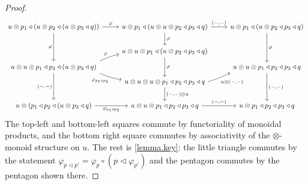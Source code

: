 \documentclass[11pt, one side, article]{memoir}
\theoremstyle{definition}
\theoremstyle{plain}
\newcommand{\0}{\textsf{0}}
\newcommand{\1}{\tn{\textsf{1}}}
\newcommand{\tri}{\mathbin{\triangleleft}}
\begin{document}
\begin{proof}
\[\fontsize{9.6pt}{9.6pt}\selectfont
\begin{tikzcd}
	u\otimes p_1\tri(u\otimes p_2\tri(u\otimes p_3\tri q))\ar[r, "\varphi"]\ar[dd, "\varphi"']&
	u\otimes p_1\tri(u\otimes u\otimes p_2\tri p_3\tri q)\ar[r, "{(-,-)}"]\ar[d, "\varphi"]&
	u\otimes p_1\tri(u\otimes p_2\tri p_3\tri q)\ar[dd, "\varphi"]\\&
	u\otimes u\otimes p_1\tri(u\otimes p_2\tri p_3\tri q)\ar[dd, "\varphi"]\\[-12pt]
	u\otimes u\otimes p_1\tri p_2\tri(u\otimes p_3\tri q)\ar[dd, "{(-,-)}"']\ar[ur, bend left=5pt, start anchor={north east}, "\varphi"]\ar[dr, bend right=5pt, start anchor={south east}, "\varphi_{p_1\tri p_2}"']&&
	u\otimes u\otimes p_1\tri p_2\tri p_3\tri q\ar[dd, "{(-,-)}"]\\[-12pt]&
	u\otimes u\otimes u\otimes p_1\tri p_2\tri p_3\tri q\ar[d, "{(-,-)}\otimes u"]\ar[ur, bend right=5pt, start anchor={east}, end anchor={south west}, "u\otimes{(-,-)}"']\\
	u\otimes(p_1\tri p_2\tri(u\otimes p_3\tri q)\ar[r, "\varphi_{p_1\tri p_2}"']&
	u\otimes u\otimes p_1\tri p_2\tri p_3\tri q\ar[r, "{(-,-)}"]&
	u\otimes p_1\tri p_2\tri p_3\tri q
\end{tikzcd}
\]
The top-left and bottom-left squares commute by functoriality of monoidal products, and the bottom right square commutes by associativity of the $\otimes$-monoid structure on $u$. The rest is \cref{lemma.key}: the little triangle commutes by the statement $\varphi_{p\tri p'}=\varphi_{p}\circ (p\tri\varphi_{p'})$ and the pentagon commutes by the pentagon shown there.
\end{proof}

\printbibliography
\end{document}
